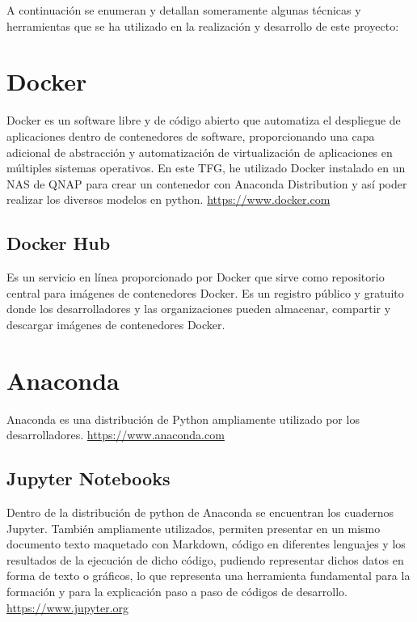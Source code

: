 
A continuación se enumeran y detallan someramente algunas técnicas y herramientas que se ha utilizado en la realización y desarrollo de este proyecto:

\section{Docker}

Docker\cite{docker:2013} es un software libre y de código abierto que automatiza el despliegue de aplicaciones dentro de contenedores de software, proporcionando una capa adicional de abstracción y automatización de virtualización de aplicaciones en múltiples sistemas operativos. En este TFG, he utilizado Docker instalado en un NAS de QNAP para crear un contenedor con Anaconda Distribution y así poder realizar los diversos modelos en python. \url{https://www.docker.com}

\subsection{Docker Hub}

Es un servicio en línea proporcionado por Docker que sirve como repositorio central para imágenes de contenedores Docker. Es un registro público y gratuito donde los desarrolladores y las organizaciones pueden almacenar, compartir y descargar imágenes de contenedores Docker.

\section{Anaconda}

Anaconda\cite{anaconda:2012} es una distribución de Python ampliamente utilizado por los desarrolladores. \url{https://www.anaconda.com}

\subsection{Jupyter Notebooks}

Dentro de la distribución de python de Anaconda se encuentran los cuadernos Jupyter\cite{jupyter:2014}. También ampliamente utilizados, permiten presentar en un mismo documento texto maquetado con Markdown, código en diferentes lenguajes y los resultados de la ejecución de dicho código, pudiendo representar dichos datos en forma de texto o gráficos, lo que representa una herramienta fundamental para la formación y para la explicación paso a paso de códigos de desarrollo. \url{https://www.jupyter.org}

